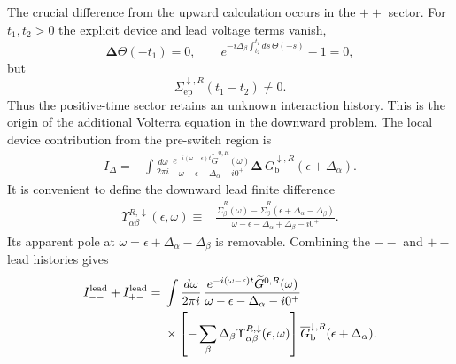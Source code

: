 \documentclass[
 reprint,
 superscriptaddress,
 amsmath,amssymb,
 aps,prb,
 longbibliography,
 floatfix
]{revtex4-2}
\newcommand{\ep}{\mathrm{ep}}
\newcommand{\barSigma}{\overline{\Sigma}}
\begin{document}
The crucial difference from the upward calculation occurs in the $++$ sector. For $t_1,t_2>0$ the explicit device and lead voltage terms vanish,
\begin{equation*}
\bm\Delta\Theta(-t_1)=0,
\qquad
e^{-i\Delta_\beta
\int_{t_2}^{t_1}ds\,\Theta(-s)}-1=0,
\end{equation*}
but
\begin{equation*}
\barSigma_{\ep}^{\downarrow,R}(t_1-t_2)
\neq0.
\end{equation*}
Thus the positive-time sector retains an unknown interaction history. This is the origin of the additional Volterra equation in the downward problem. The local device contribution from the pre-switch region is
\begin{equation*}
\begin{aligned}
I_\Delta
={}&
\int\frac{d\omega}{2\pi i}\,
\frac{
e^{-i(\omega-\epsilon)t}
\widetilde G^{0,R}(\omega)}
{\omega-\epsilon-\Delta_\alpha-i0^+}
\bm\Delta\,
\overline G_{\mathrm b}^{\downarrow,R}
(\epsilon+\Delta_\alpha).
\end{aligned}
\end{equation*}
It is convenient to define the downward lead finite difference
\begin{equation*}
\begin{aligned}
\Upsilon_{\alpha\beta}^{R,\downarrow}
(\epsilon,\omega)
\equiv{}&
\frac{
\widetilde\Sigma_\beta^R(\omega)
-
\widetilde\Sigma_\beta^R
(\epsilon+\Delta_\alpha-\Delta_\beta)}
{
\omega-\epsilon-\Delta_\alpha
+\Delta_\beta-i0^+
}.
\end{aligned}
\end{equation*}
Its apparent pole at $\omega=\epsilon+\Delta_\alpha-\Delta_\beta$ is removable. Combining the $--$ and $+-$ lead histories gives
\begin{equation*}
\begin{aligned}
I_{--}^{\rm lead}
+
I_{+-}^{\rm lead}
={}&
\int\frac{d\omega}{2\pi i}\,
\frac{
e^{-i(\omega-\epsilon)t}
\widetilde G^{0,R}(\omega)}
{\omega-\epsilon-\Delta_\alpha-i0^+}
\\
&\times
\left[
-\sum_\beta
\Delta_\beta
\Upsilon_{\alpha\beta}^{R,\downarrow}
(\epsilon,\omega)
\right]
\overline G_{\mathrm b}^{\downarrow,R}
(\epsilon+\Delta_\alpha).
\end{aligned}
\end{equation*}
\end{document}
